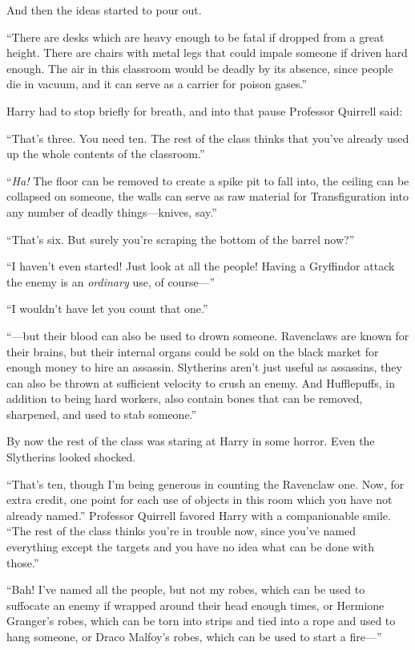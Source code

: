 And then the ideas started to pour out.

“There are desks which are heavy enough to be fatal if dropped from a great height. There are chairs with metal legs that could impale someone if driven hard enough. The air in this classroom would be deadly by its absence, since people die in vacuum, and it can serve as a carrier for poison gases.”

Harry had to stop briefly for breath, and into that pause Professor Quirrell said:

“That’s three. You need ten. The rest of the class thinks that you’ve already used up the whole contents of the classroom.”

“\emph{Ha!} The floor can be removed to create a spike pit to fall into, the ceiling can be collapsed on someone, the walls can serve as raw material for Transfiguration into any number of deadly things—knives, say.”

“That’s six. But surely you’re scraping the bottom of the barrel now?”

“I haven’t even started! Just look at all the people! Having a Gryffindor attack the enemy is an \emph{ordinary} use, of course—”

“I wouldn’t have let you count that one.”

“—but their blood can also be used to drown someone. Ravenclaws are known for their brains, but their internal organs could be sold on the black market for enough money to hire an assassin. Slytherins aren’t just useful as assassins, they can also be thrown at sufficient velocity to crush an enemy. And Hufflepuffs, in addition to being hard workers, also contain bones that can be removed, sharpened, and used to stab someone.”

By now the rest of the class was staring at Harry in some horror. Even the Slytherins looked shocked.

“That’s ten, though I’m being generous in counting the Ravenclaw one. Now, for extra credit, one point for each use of objects in this room which you have not already named.” Professor Quirrell favored Harry with a companionable smile. “The rest of the class thinks you’re in trouble now, since you’ve named everything except the targets and you have no idea what can be done with those.”

“Bah! I’ve named all the people, but not my robes, which can be used to suffocate an enemy if wrapped around their head enough times, or Hermione Granger’s robes, which can be torn into strips and tied into a rope and used to hang someone, or Draco Malfoy’s robes, which can be used to start a fire—”

